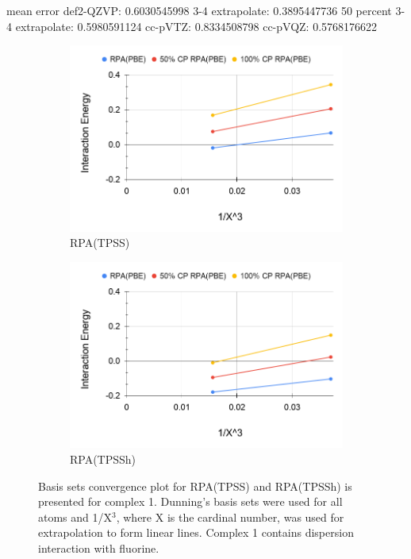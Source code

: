 \documentclass[11pt]{article}
\begin{document}
mean error
def2-QZVP: 0.6030545998
3-4 extrapolate: 0.3895447736
50 percent 3-4 extrapolate: 0.5980591124
cc-pVTZ: 0.8334508798
cc-pVQZ: 0.5768176622


\begin{figure}[H]
  \centering
  \begin{subfigure}{.5\textwidth}
    \centering
    \includegraphics[scale=0.3]{tpss-1.png}
    \caption{RPA(TPSS)}
    \label{fig:tpss_1}
  \end{subfigure}%
  \begin{subfigure}{.5\textwidth}
    \centering
    \includegraphics[scale=0.3]{tpssh-1.png}
    \caption{RPA(TPSSh)}
    \label{fig:tpssh_1}
  \end{subfigure}
  \caption{Basis sets convergence plot for RPA(TPSS) and RPA(TPSSh) is
    presented for complex 1. Dunning's basis sets were used for all atoms
    and 1/X$^3$, where X is the cardinal number, was used for
    extrapolation to form linear lines. Complex 1 contains dispersion
    interaction with fluorine.}
  \label{fig:complex_1}
\end{figure}
\end{document}
